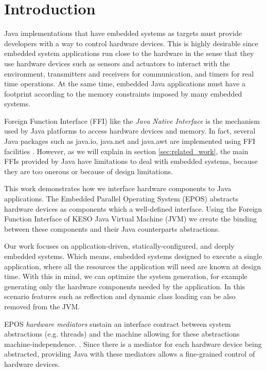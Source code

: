 \documentclass[12pt]{article} %
\begin{document}
\section{Introduction}
Java implementations that have embedded systems as targets must provide developers with a way to control hardware devices. This is highly desirable since embedded system applications run close to the hardware in the sense that they use hardware devices such as sensors and actuators to interact with the environment, transmitters and receivers for communication, and timers for real time operations. At the same time, embedded Java applications must have a footprint according to the memory constraints imposed by many embedded systems.

Foreign Function Interface (FFI) like the \emph{Java Native Interface} is the mechanism used by Java platforms to access hardware devices and memory. In fact, several Java packages such as java.io, java.net and java.awt are implemented using FFI facilities \cite{Liang:1999}. However, as we will explain in section \ref{sec:related_work}, the main FFIs provided by Java have limitations to deal with embedded systems, because they are too onerous or because of design limitations.

This work demonstrates how we interface hardware components to Java applications. The Embedded Parallel Operating System (EPOS) abstracts hardware devices as components which a well-defined interface. Using the Foreign Function Interface of KESO Java Virtual Machine (JVM) we create the binding between these components and their Java counterparts abstractions. 

Our work focuses on application-driven, statically-configured, and deeply embedded systems. Which means, embedded systems designed to execute a single application, where all the resources the application will need are known at design time. With this in mind, we can optimize the system generation, for example generating only the hardware components needed by the application. In this scenario features such as reflection and dynamic class loading can be also removed from the JVM.

EPOS \emph{hardware mediators} sustain an interface contract between system abstractions (e.g. threads) and the machine allowing for these abstractions machine-independence. \cite{Polpeta:2004}. Since there is a mediator for each hardware device being abstracted, providing Java with these mediators allows a fine-grained control of hardware devices.
\end{document}
